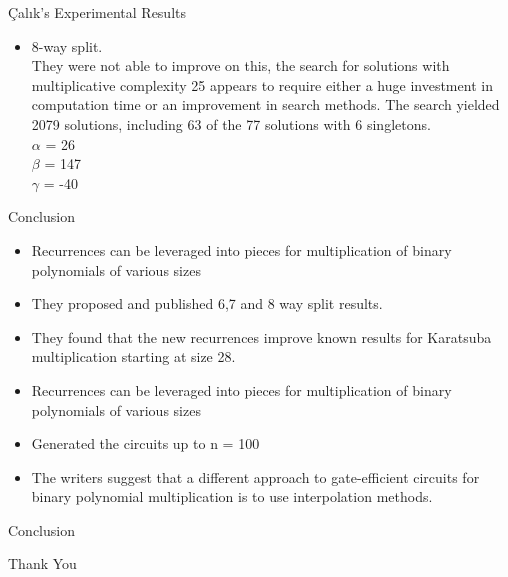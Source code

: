 \documentclass[12pt]{beamer}
\begin{document}
\begin{frame}{Çalık's Experimental Results}

\begin{itemize}

  \item 8-way split.\\
 They were not able to improve on this, the search for solutions
with multiplicative complexity 25 appears to require either a huge investment in computation time or an improvement in search methods. The search yielded 2079 solutions, including 63 of the 77 solutions with 6 singletons.\\
$\alpha$ = 26\\
$\beta$ = 147\\
$\gamma$ = -40
  
\end{itemize}

\end{frame}

\begin{frame}{Conclusion}

\begin{itemize}

  \item Recurrences can be leveraged into pieces for multiplication of binary polynomials of various sizes\\
  \item They proposed and published 6,7 and 8 way split results.
\item They found that the new recurrences improve known results for Karatsuba multiplication starting at size 28.\\
\item Recurrences can be leveraged into pieces for multiplication of binary polynomials of various sizes\\
\item Generated the circuits up to n = 100\\
\item The writers suggest that a different approach to gate-efficient circuits for binary polynomial multiplication is to use interpolation methods.\\


  
\end{itemize}

\end{frame}


\begin{frame}{Conclusion}

\begin{center}
Thank You
\end{center}

  

\end{frame}
\end{document}
